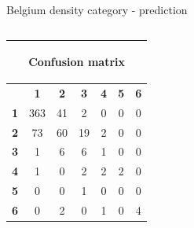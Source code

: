 \documentclass[c]{beamer}
\begin{document}
\begin{frame}
\begin{columns}
\begin{column}{0.5\textwidth}
\begin{overlayarea}{\linewidth}{4cm}
  \end{overlayarea}
  \begin{overlayarea}{\linewidth}{0.5cm}
    \centering
    \tiny Belgium density category - prediction\par
  \end{overlayarea}
 \end{column}
\end{columns}
\begin{columns}
 \begin{column}{0.6\textwidth}
 \begin{overlayarea}{\linewidth}{2cm}
  \begin{table}
  \begin{center}
  \begin{adjustbox}{max width=0.6\textwidth}
  {\tiny
  \begin{tabular}{|c|c|c|c|c|c|c|}
    \hline
    \multicolumn{7}{|c|}{{\tiny \begin{bf}Confusion matrix\end{bf}}} \\
    \hline
     & \textbf{1} & \textbf{2} & \textbf{3} & \textbf{4} & \textbf{5} & \textbf{6}\\
    \hline
    \textbf{1} & 363 & 41 & 2 & 0 & 0 & 0\\
    \hline
    \textbf{2} & 73 & 60 & 19 & 2 & 0 & 0\\
    \hline
    \textbf{3} & 1 & 6 & 6 & 1 & 0 & 0\\
    \hline
    \textbf{4} & 1 & 0 & 2 & 2 & 2 & 0\\
    \hline
    \textbf{5} & 0 & 0 & 1 & 0 & 0 & 0\\
    \hline
    \textbf{6} & 0 & 2 & 0 & 1 & 0 & 4\\
    \hline
  \end{tabular}
  }
  \end{adjustbox}
  \end{center}
  \end{table}
 \end{overlayarea}
 \end{column}
 \begin{column}{0.6\textwidth}

\end{column}
\end{columns}
\end{frame}
\end{document}
